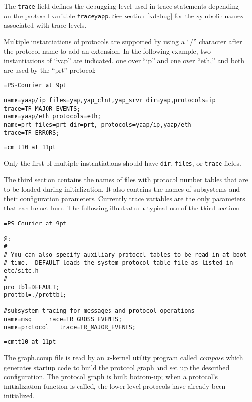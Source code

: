 The {\tt trace} field defines the debugging level used in trace
statements depending on the protocol variable {\tt traceyapp}.  See
section \ref{kdebug} for the symbolic names associated with trace levels.

Multiple instantiations of protocols are supported by using a ``/''
character after the protocol name to add an extension.  In the following
example, two instantiations of ``yap'' are indicated, one over ``ip'' and
one over ``eth,'' and both are used by the ``prt'' protocol:

\font\tt=PS-Courier at 9pt
\begin{verbatim}
name=yaap/ip files=yap,yap_clnt,yap_srvr dir=yap,protocols=ip trace=TR_MAJOR_EVENTS;
name=yaap/eth protocols=eth;
name=prt files=prt dir=prt, protocols=yaap/ip,yaap/eth trace=TR_ERRORS;
\end{verbatim}
\font\tt=cmtt10 at 11pt

Only the first of multiple instantiations should have {\tt dir},
{\tt files}, or {\tt trace} fields.

The third section contains the names of files with protocol number
tables that are to be loaded during initialization.  It also
contains the names of subsystems and their configuration parameters.
Currently trace variables are the only parameters that can be set
here.  The following illustrates a typical use of the third section:

\font\tt=PS-Courier at 9pt
\begin{verbatim}
@;
#
# You can also specify auxiliary protocol tables to be read in at boot
# time.  DEFAULT loads the system protocol table file as listed in etc/site.h
#
prottbl=DEFAULT;
prottbl=./prottbl;

#subsystem tracing for messages and protocol operations
name=msg	trace=TR_GROSS_EVENTS;
name=protocol	trace=TR_MAJOR_EVENTS;
\end{verbatim}
\font\tt=cmtt10 at 11pt

The graph.comp file is read by an $x$-kernel utility program called
{\em compose} which generates startup code to build the protocol
graph and set up the described configuration.  The protocol graph is
built bottom-up; when a protocol's initialization function is called,
the lower level-protocols have already been initialized.


